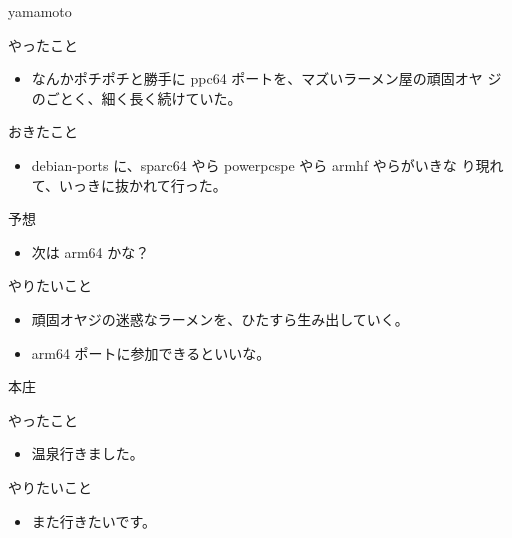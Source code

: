 \begin{prework}{ yamamoto }

やったこと
\begin{itemize}
 \item なんかポチポチと勝手に ppc64 ポートを、マズいラーメン屋の頑固オヤ
       ジのごとく、細く長く続けていた。
\end{itemize}
おきたこと
\begin{itemize}
 \item debian-ports に、sparc64 やら powerpcspe やら armhf やらがいきな
       り現れて、いっきに抜かれて行った。
\end{itemize}
予想
\begin{itemize}
 \item 次は arm64 かな？
\end{itemize}
やりたいこと
\begin{itemize}
 \item 頑固オヤジの迷惑なラーメンを、ひたすら生み出していく。
 \item arm64 ポートに参加できるといいな。
\end{itemize}
\end{prework}

\begin{prework}{ 本庄 }

やったこと
\begin{itemize}
\item 温泉行きました。
\end{itemize}
やりたいこと
\begin{itemize}
\item また行きたいです。
\end{itemize}
\end{prework}

